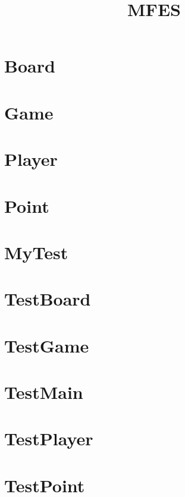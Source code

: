 \documentclass{article}
\begin{document}
\title{MFES}
\author{}
\maketitle
\tableofcontents

\section{Board}

\section{Game}

\section{Player}

\section{Point}

\section{MyTest}

\section{TestBoard}

\section{TestGame}

\section{TestMain}

\section{TestPlayer}

\section{TestPoint}

\end{document}
